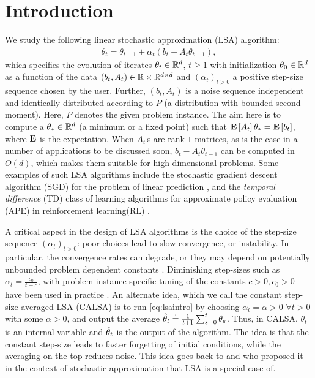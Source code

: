 
\section{Introduction}\label{sec:intro}
We study the following linear stochastic approximation (LSA) algorithm: 
\begin{align}\label{eq:lsaintro}
\theta_t=\theta_{t-1}+\alpha_t (b_t-A_t \theta_{t-1}),
\end{align}
which specifies the evolution of iterates $\theta_t\in\mathbb{R}^d$, $t\geq 1$ with initialization $\theta_0\in\mathbb{R}^d$ as a function of the data $(b_t,A_t)\in\mathbb{R}\times \mathbb{R}^{d \times d}$  and $(\alpha_t)_{t>0}$ a positive step-size sequence chosen by the user. Further, $(b_t,A_t)$ is a noise sequence independent and identically distributed according to $P$ (a distribution with bounded second moment). Here, $P$ denotes the given problem instance. The aim here is to compute a $\theta_*\in\mathbb{R}^d$ (a minimum or a fixed point) such that $\mathbf{E}\left[A_t\right]\theta_*=\mathbf{E}\left[b_t\right]$, where $\mathbf{E}$ is the expectation. When $A_t\,$s are rank-$1$ matrices, as is the case in a number of applications to be discussed soon, $b_t -A_t\theta_{t-1}$ can be computed in $O(d)$, which makes them suitable for high dimensional problems. Some examples of such LSA algorithms include the stochastic gradient descent algorithm (SGD) for the problem of linear prediction \cite{bach,bachaistats}, and the \emph{temporal difference} (TD) class of learning algorithms for approximate policy evaluation (APE) in reinforcement learning(RL) \cite{sutton,konda-tsitsiklis,KoTsi03LSA,gtd,gtd2,gtdmp}.

A critical aspect in the design of LSA algorithms is the choice of the step-size sequence $(\alpha_t)_{t> 0}$: poor choices lead to slow convergence, or instability. In particular, the convergence rates can degrade, or they may depend on potentially unbounded problem dependent constants \cite{bach-moulines}. Diminishing step-sizes such as $\alpha_t=\frac{c_0}{t+c}$, with problem instance specific tuning of the constants $c>0,c_0>0$ have been used in practice \cite{gtd2,gtdmp,konda-tsitsiklis}. An alternate idea, which we call the constant step-size averaged LSA (CALSA) is to run \eqref{eq:lsaintro} by choosing $\alpha_t=\alpha>0$ $\forall t> 0$ with some $\alpha>0$, and output the average $\hat{\theta}_t\stackrel{\cdot}{=}\frac{1}{t+1}\sum_{s=0}^t \theta_s$. Thus, in CALSA, $\theta_t$ is an internal variable and $\hat{\theta}_t$ is the output of the algorithm. The idea is that the constant step-size leads to faster forgetting of initial conditions, while the averaging on the top reduces noise. This idea goes back to  \citet{ruppert} and \citet{polyak-judisky} who proposed it in the context of stochastic approximation that LSA is a special case of.   

